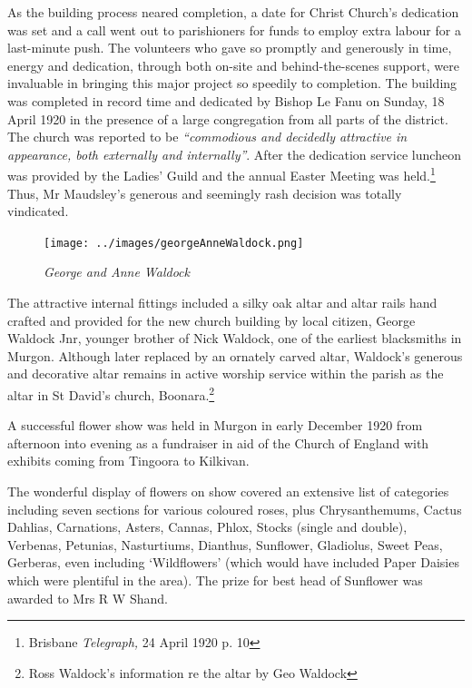 As the building process neared completion, a date for Christ Church's dedication was set and a call went out to parishioners for funds to employ extra labour for a last-minute push. The volunteers who gave so promptly and generously in time, energy and dedication, through both on-site and behind-the-scenes support, were invaluable in bringing this major project so speedily to completion. The building was completed in record time and dedicated by Bishop Le Fanu on Sunday, 18 April 1920 in the presence of a large congregation from all parts of the district. The church was reported to be \emph{``commodious and decidedly attractive in appearance, both externally and internally''}. After the dedication service luncheon was provided by the Ladies' Guild and the annual Easter Meeting was held.\footnote{Brisbane \emph{Telegraph,} 24 April 1920 p. 10} Thus, Mr Maudsley's generous and seemingly rash decision was totally vindicated.








\begin{figure}
\begin{center}
\texttt{[image: ../images/georgeAnneWaldock.png]}
\caption{\itshape George and Anne Waldock}
\end{center}
\end{figure}




The attractive internal fittings included a silky oak altar and altar rails hand crafted and provided for the new church building by local citizen, George Waldock Jnr, younger brother of Nick Waldock, one of the earliest blacksmiths in Murgon. Although later replaced by an ornately carved altar, Waldock's generous and decorative altar remains in active worship service within the parish as the altar in St David's church, Boonara.\footnote{Ross Waldock's information re the altar by Geo Waldock}


A successful flower show was held in Murgon in early December 1920 from afternoon into evening as a fundraiser in aid of the Church of England with exhibits coming from Tingoora to Kilkivan.



The wonderful display of flowers on show covered an extensive list of categories including seven sections for various coloured roses, plus Chrysanthemums, Cactus Dahlias, Carnations, Asters, Cannas, Phlox, Stocks (single and double), Verbenas, Petunias, Nasturtiums, Dianthus, Sunflower, Gladiolus, Sweet Peas, Gerberas, even including `Wildflowers' (which would have included Paper Daisies which were plentiful in the area). The prize for best head of Sunflower was awarded to Mrs R W Shand.



